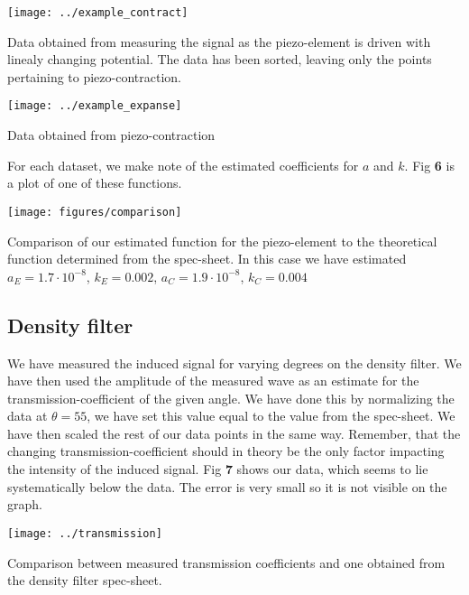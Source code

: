 \documentclass[working, oneside]{inputs/tuftebook}
\begin{document}
\begin{marginfigure}[-450pt]
	\texttt{[image: ../example\_contract]}
	\caption{Data obtained from measuring the signal as the piezo-element is driven with linealy changing potential. The data has been sorted, leaving only the points pertaining to piezo-contraction.}
\end{marginfigure}
\begin{marginfigure}[-250pt]
	\texttt{[image: ../example\_expanse]}
	\caption{Data obtained from piezo-contraction}
\end{marginfigure}
For each dataset, we make note of the estimated coefficients for $a$ and $k$. Fig  \textbf{6} is a plot of one of these functions. 
\begin{marginfigure}[-100pt]
	\texttt{[image: figures/comparison]}
	\caption{Comparison of our estimated function for the piezo-element to the theoretical function determined from the spec-sheet. In this case we have estimated $a_E = 1.7 \cdot 10^{-8}$, $k_E = 0.002$,  $a_C = 1.9 \cdot 10^{-8}$, $k_C = 0.004$}
\end{marginfigure}
\subsection*{Density filter}
We have measured the induced signal for varying degrees on the density filter. We have then used the amplitude of the measured wave as an estimate for the transmission-coefficient of the given angle. We have done this by normalizing the data at $\theta = 55$, we have set this value equal to the value from the spec-sheet. We have then scaled the rest of our data points in the same way. Remember, that the changing transmission-coefficient should in theory be the only factor impacting the intensity of the induced signal. Fig \textbf{7} shows our data, which seems to lie systematically below the data. The error is very small so it is not visible on the graph.
\begin{marginfigure}[-10pt]
	\texttt{[image: ../transmission]}
	\caption{Comparison between measured transmission coefficients and one obtained from the density filter spec-sheet.}
\end{marginfigure}
\end{document}
